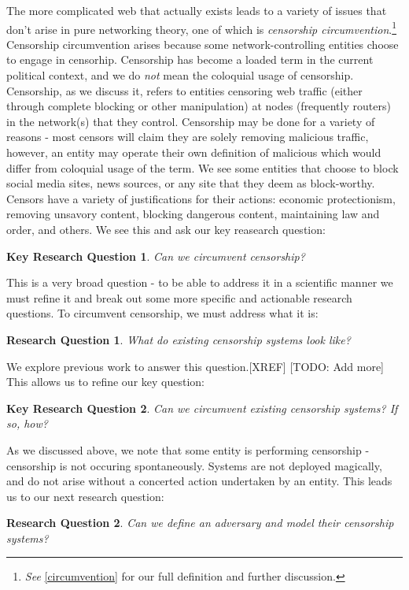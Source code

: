 \documentclass[12pt]{report}
\newtheorem{question}{Research Question}
\newtheorem*{keyq}{Key Research Question}
\begin{document}
The more complicated web that actually exists leads to a variety of issues that don't arise in pure networking theory, one of which is \emph{censorship circumvention}.\footnote{\emph{See} \ref{circumvention} for our full definition and further discussion.} Censorship circumvention arises because some network-controlling entities choose to engage in censorhip. Censorship has become a loaded term in the current political context, and we do \emph{not} mean the coloquial usage of censorship. Censorship, as we discuss it, refers to entities censoring web traffic (either through complete blocking or other manipulation) at nodes (frequently routers) in the network(s) that they control. Censorship may be done for a variety of reasons - most censors will claim they are solely removing malicious traffic, however, an entity may operate their own definition of malicious which would differ from coloquial usage of the term. We see some entities that choose to block social media sites, news sources, or any site that they deem as block-worthy. Censors have a variety of justifications for their actions: economic protectionism, removing unsavory content, blocking dangerous content, maintaining law and order, and others. We see this and ask our key reasearch question:
\begin{keyq}
Can we circumvent censorship?
\end{keyq}
This is a very broad question - to be able to address it in a scientific manner we must refine it and break out some more specific and actionable research questions. To circumvent censorship, we must address what it is:

\begin{question}
What do existing censorship systems look like?
\end{question}

We explore previous work to answer this question.[XREF] [TODO: Add more] This allows us to refine our key question:

\begin{keyq}
Can we circumvent existing censorship systems? If so, how?
\end{keyq}

As we discussed above, we note that some entity is performing censorship - censorship is not occuring spontaneously. Systems are not deployed magically, and do not arise without a concerted action undertaken by an entity. This leads us to our next research question:

\begin{question}
Can we define an adversary and model their censorship systems?
\end{question}
\end{document}
